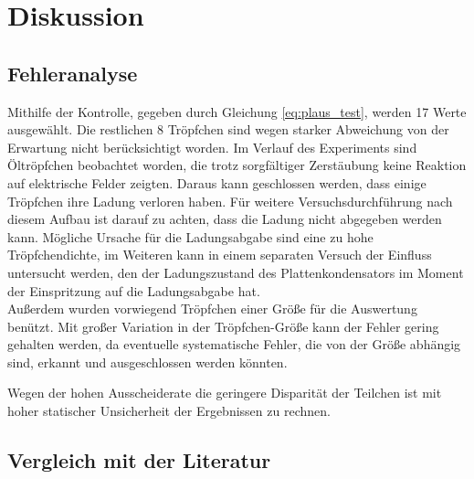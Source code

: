 \section{Diskussion}
\label{sec:Diskussion}

\subsection{Fehleranalyse}
Mithilfe der Kontrolle, gegeben durch Gleichung \eqref{eq:plaus_test}, werden 17 Werte ausgewählt.
Die restlichen 8 Tröpfchen sind wegen starker Abweichung von der Erwartung nicht berücksichtigt worden.
Im Verlauf des Experiments sind Öltröpfchen beobachtet worden, die trotz sorgfältiger Zerstäubung keine Reaktion auf elektrische Felder zeigten. 
Daraus kann geschlossen werden, dass einige Tröpfchen ihre Ladung verloren haben.
Für weitere Versuchsdurchführung nach diesem Aufbau ist darauf zu achten, dass die Ladung nicht abgegeben werden kann.
Mögliche Ursache für die Ladungsabgabe sind eine zu hohe Tröpfchendichte,
im Weiteren kann in einem separaten Versuch der Einfluss untersucht werden, 
den der Ladungszustand des Plattenkondensators im Moment der Einspritzung auf die Ladungsabgabe hat.\\
Außerdem wurden vorwiegend Tröpfchen einer Größe für die Auswertung benützt.
Mit großer Variation in der Tröpfchen-Größe kann der Fehler gering gehalten werden, da eventuelle systematische Fehler, die von der Größe abhängig sind, erkannt und ausgeschlossen werden könnten.

Wegen der hohen Ausscheiderate die geringere Disparität der Teilchen ist mit hoher statischer Unsicherheit der Ergebnissen zu rechnen.

\subsection{Vergleich mit der Literatur}
